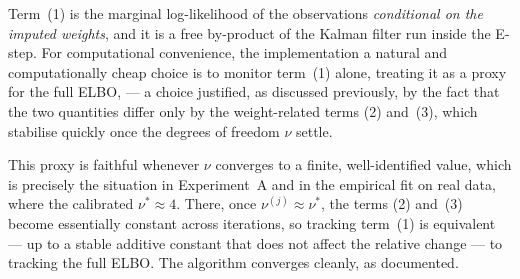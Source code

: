 \documentclass[11pt, a4paper, oneside]{article}
\begin{document}
Term~(1) is the marginal
log-likelihood of the observations \emph{conditional on the imputed
weights}, and it is a free by-product of the Kalman filter run inside
the E-step. For computational convenience, the implementation a natural and computationally cheap choice is to monitor term~(1)
alone, treating it as a proxy for the full ELBO, --- a choice justified, as discussed previously, by the fact that the two
quantities differ only by the weight-related terms (2) and~(3), which
stabilise quickly once the degrees of freedom $\nu$ settle.

This proxy is faithful whenever $\nu$ converges to a finite,
well-identified value, which is precisely the situation in
Experiment~A and in the empirical fit on real data, where the
calibrated $\nu^* \approx 4$. There, once $\nu^{(j)} \approx \nu^*$,
the terms (2) and~(3) become essentially constant across iterations,
so tracking term~(1) is equivalent --- up to a stable additive
constant that does not affect the relative change --- to tracking the
full ELBO. The algorithm converges cleanly, as documented.
\end{document}
